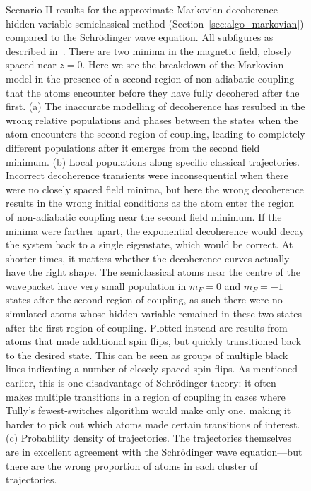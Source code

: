 {\begin{figure}
    \caption{Scenario II results for the approximate Markovian decoherence hidden-variable semiclassical method (Section~\ref{sec:algo_markovian}) compared to the Schr\"odinger wave equation. All subfigures as described in~. There are two minima in the magnetic field, closely spaced near $z=0$. Here we see the breakdown of the Markovian model in the presence of a second region of non-adiabatic coupling that the atoms encounter before they have fully decohered after the first. (a) The inaccurate modelling of decoherence has resulted in the wrong relative populations and phases between the states when the atom encounters the second region of coupling, leading to completely different populations after it emerges from the second field minimum. (b) Local populations along specific classical trajectories. Incorrect decoherence transients were inconsequential when there were no closely spaced field minima, but here the wrong decoherence results in the wrong initial conditions as the atom enter the region of non-adiabatic coupling near the second field minimum. If the minima were farther apart, the exponential decoherence would decay the system back to a single eigenstate, which would be correct. At shorter times, it matters whether the decoherence curves actually have the right shape. The semiclassical atoms near the centre of the wavepacket have very small population in $m_F=0$ and $m_F=-1$ states after the second region of coupling, as such there were no simulated atoms whose hidden variable remained in these two states after the first region of coupling. Plotted instead are results from atoms that made additional spin flips, but quickly transitioned back to the desired state. This can be seen as groups of multiple black lines indicating a number of closely spaced spin flips. As mentioned earlier, this is one disadvantage of Schr\"odinger theory: it often makes multiple transitions in a region of coupling in cases where Tully's fewest-switches algorithm would make only one, making it harder to pick out which atoms made certain transitions of interest. (c) Probability density of trajectories. The trajectories themselves are in excellent agreement with the Schr\"odinger wave equation---but there are the wrong proportion of atoms in each cluster of trajectories.}\label{fig:scenario_two_markovian}
\end{figure}
\restoregeometry}

